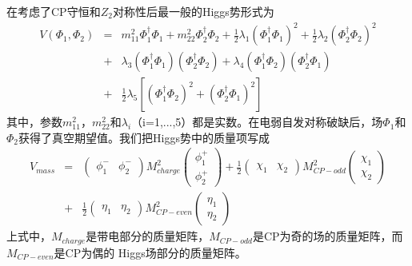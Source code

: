 在考虑了CP守恒和$Z_2$对称性后最一般的Higgs势形式为
\begin{eqnarray}
V(\Phi_1, \Phi_2) &=& m^2_{11}\Phi^{\dagger}_1\Phi_1 + m^2_{22}\Phi^{\dagger}_2\Phi_2 + 
\frac{1}{2}\lambda_1(\Phi^{\dagger}_1\Phi_1)^2 + \frac{1}{2}\lambda_2(\Phi^{\dagger}_2\Phi_2)^2
\nonumber \\
&+& \lambda_3(\Phi^{\dagger}_1\Phi_1)(\Phi^{\dagger}_2\Phi_2) + 
\lambda_4(\Phi^{\dagger}_1\Phi_2)(\Phi^{\dagger}_2\Phi_1) 
\nonumber \\
&+& \frac{1}{2}\lambda_5\left[(\Phi^{\dagger}_1\Phi_2)^2 + (\Phi^{\dagger}_2\Phi_1)^2\right]
\end{eqnarray}
其中，参数$m^2_{11}$，$m^2_{22}$和$\lambda_i$（i=1,...,5）都是实数。在电弱自发对称破缺后，场$\Phi_1$和
$\Phi_2$获得了真空期望值。我们把Higgs势中的质量项写成
\begin{eqnarray}
V_{mass} &=& (\begin{array}{cc}\phi^-_1 & \phi^-_2 \end{array})M^2_{charge}
\left(\begin{array}{c}\phi^+_1 \\ \phi^+_2 \end{array}\right) + 
\frac{1}{2}(\begin{array}{cc}\chi_1 & \chi_2\end{array}) M^2_{CP-odd}
\left(\begin{array}{c}\chi_1 \\ \chi_2 \end{array}\right) 
\nonumber \\
&+& \frac{1}{2}(\begin{array}{cc}\eta_1 & \eta_2\end{array}) M^2_{CP-even}
\left(\begin{array}{c}\eta_1 \\ \eta_2 \end{array}\right) 
\end{eqnarray}
上式中，$M_{charge}$是带电部分的质量矩阵，$M_{CP-odd}$是CP为奇的场的质量矩阵，而$M_{CP-even}$是CP为偶的
Higgs场部分的质量矩阵。

